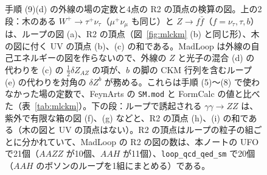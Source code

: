 \documentclass[a4paper,10pt]{ltjsarticle}
\begin{document}
\begin{figure}[tbp]
\caption{手順 (9)(d) の外線の場の定数と4点の R2 の頂点の検算の図。上の2段：木のある $W^+\to\tau^+\nu_\tau$（$\mu^+\nu_\mu$ も同じ）と $Z\to f\bar f$（$f=\nu_\tau,\tau,b$）は、ループの図 (a)、R2 の頂点（図~\ref{fig:mlckm} (b) と同じ形）、木の図に付く UV の頂点 (b)、(c) の和である。MadLoop は外線の自己エネルギーの図を作らないので、外線の $Z$ と光子の混合 (d) の代わりを (c) の $\frac12\delta Z_{AZ}$ の項が、$b$ の脚の CKM 行列を含むループ (e) の代わりを対角の $\delta Z^b$ が務める。これらは手順 (5)〜(8) で使わなかった場の定数で、FeynArts の \texttt{SM.mod} と FormCalc の値と比べた（表~\ref{tab:mlckm}）。下の段：ループで誘起される $\gamma\gamma\to ZZ$ は、紫外で有限な箱の図 (f)、(g) などと、R2 の頂点 (h)、(i) の和である（木の図と UV の頂点はない）。R2 の頂点はループの粒子の組ごとに分かれていて、MadLoop の R2 の図の数は、本ノートの UFO で21個（$AAZZ$ が10個、$AAH$ が11個）、\texttt{loop\_qcd\_qed\_sm} で20個（$AAH$ のボソンのループを1組にまとめる）である。}
\label{fig:mlext}
\end{figure}
\end{document}
